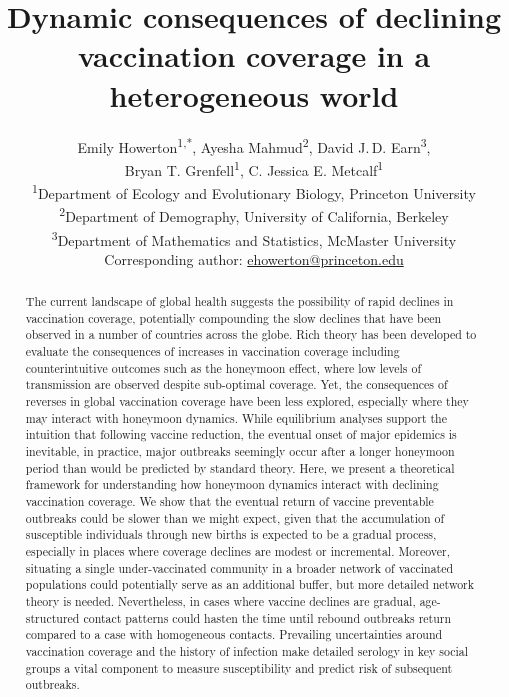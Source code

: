 \documentclass[12pt,letterpaper]{article}
\title{\textbf{Dynamic consequences of declining vaccination coverage in a heterogeneous world}}
\author{%
  Emily Howerton\textsuperscript{1,*},
  Ayesha Mahmud\textsuperscript{2},
  David J.\,D. Earn\textsuperscript{3},\\
  Bryan T. Grenfell\textsuperscript{1},
  C. Jessica E. Metcalf\textsuperscript{1}\\[0.8em]
  \small \textsuperscript{1}Department of Ecology and Evolutionary Biology, Princeton University\\
  \small \textsuperscript{2}Department of Demography, University of California, Berkeley\\
  \small \textsuperscript{3}Department of Mathematics and Statistics, McMaster University\\[0.5em]
  \small *Corresponding author: \href{mailto:ehowerton@princeton.edu}{ehowerton@princeton.edu}
}
\date{}
\begin{document}
\maketitle
\linenumbers

\begin{abstract}
The current landscape of global health suggests the possibility of rapid
declines in vaccination coverage, potentially compounding the slow
declines that have been observed in a number of countries across the
globe. Rich theory has been developed to evaluate the consequences of
increases in vaccination coverage including counterintuitive outcomes
such as the honeymoon effect, where low levels of transmission are
observed despite sub-optimal coverage. Yet, the consequences of reverses
in global vaccination coverage have been less explored, especially where
they may interact with honeymoon dynamics. While equilibrium analyses
support the intuition that following vaccine reduction, the eventual
onset of major epidemics is inevitable, in practice, major outbreaks
seemingly occur after a longer honeymoon period than would be predicted
by standard theory. Here, we present a theoretical framework for understanding how honeymoon dynamics interact with declining vaccination coverage. We show that the eventual return of vaccine preventable outbreaks could be slower than we might expect, given that the accumulation of susceptible individuals through new births is expected to be a gradual process, especially in places where coverage declines
are modest or incremental. Moreover, situating a single under-vaccinated community in a broader network of vaccinated populations could potentially serve as an additional buffer, but more detailed network theory is needed. Nevertheless, in cases where vaccine declines are gradual, age-structured contact patterns could hasten the time until rebound outbreaks return compared to a case with homogeneous contacts. Prevailing uncertainties around vaccination coverage and the history of infection make detailed
serology in key social groups a vital component to measure susceptibility
and predict risk of subsequent outbreaks.
\end{abstract}



\begingroup
\small


\endgroup
\end{document}
